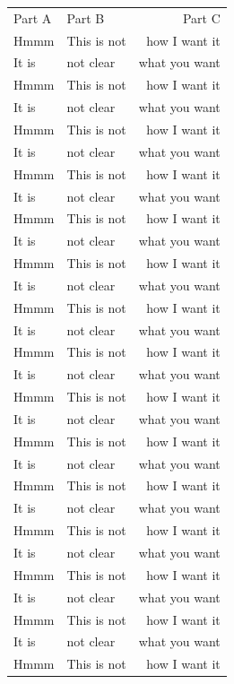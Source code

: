 \documentclass[phd,showgrids]{ndsu-thesis-2022}
\begin{document}
\begin{longtable}{l @{\hspace{2cm}} l @{\hspace{1.5cm}} r}
Part A  &   Part B      &   Part C      \\
Hmmm    & This is not   & how I want it \\
It is   & not clear     & what you want \\
Hmmm    & This is not   & how I want it \\
It is   & not clear     & what you want \\
Hmmm    & This is not   & how I want it \\
It is   & not clear     & what you want \\
Hmmm    & This is not   & how I want it \\
It is   & not clear     & what you want \\
Hmmm    & This is not   & how I want it \\
It is   & not clear     & what you want \\
Hmmm    & This is not   & how I want it \\
It is   & not clear     & what you want \\
Hmmm    & This is not   & how I want it \\
It is   & not clear     & what you want \\
Hmmm    & This is not   & how I want it \\
It is   & not clear     & what you want \\
Hmmm    & This is not   & how I want it \\
It is   & not clear     & what you want \\
Hmmm    & This is not   & how I want it \\
It is   & not clear     & what you want \\
Hmmm    & This is not   & how I want it \\
It is   & not clear     & what you want \\
Hmmm    & This is not   & how I want it \\
It is   & not clear     & what you want \\
Hmmm    & This is not   & how I want it \\
It is   & not clear     & what you want \\
Hmmm    & This is not   & how I want it \\
It is   & not clear     & what you want \\
Hmmm    & This is not   & how I want it \\

\end{longtable}
\end{document}
